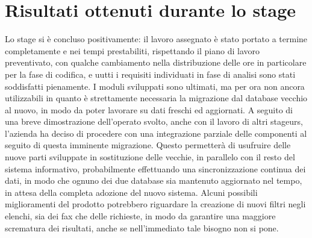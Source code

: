 \section{Risultati ottenuti durante lo stage}
Lo stage si \`e concluso positivamente: il lavoro assegnato \`e stato portato a termine completamente e nei tempi prestabiliti, rispettando il piano di lavoro preventivato, con qualche cambiamento nella distribuzione delle ore in particolare per la fase di codifica, e uutti i requisiti individuati in fase di analisi sono stati soddisfatti pienamente. 
I moduli sviluppati sono ultimati, ma per ora non ancora utilizzabili in quanto \`e strettamente necessaria la migrazione dal database vecchio al nuovo, in modo da poter lavorare su dati freschi ed aggiornati. A seguito di una breve dimostrazione dell'operato svolto, anche con il lavoro di altri stageurs, l'azienda ha deciso di procedere con una integrazione parziale delle componenti al seguito di questa imminente migrazione. Questo permetter\`a di usufruire delle nuove parti sviluppate in sostituzione delle vecchie, in parallelo con il resto del sistema informativo, probabilmente effettuando una sincronizzazione continua dei dati, in modo che ognuno dei due database sia mantenuto aggiornato nel tempo, in attesa della completa adozione del nuovo sistema. 
Alcuni possibili miglioramenti del prodotto potrebbero riguardare la creazione di nuovi filtri negli elenchi, sia dei fax che delle richieste, in modo da garantire una maggiore scrematura dei risultati, anche se nell'immediato tale bisogno non si pone.

